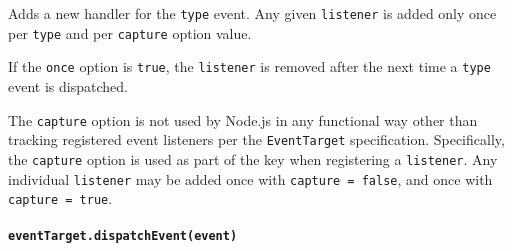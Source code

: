Adds a new handler for the \texttt{type} event. Any given
\texttt{listener} is added only once per \texttt{type} and per
\texttt{capture} option value.

If the \texttt{once} option is \texttt{true}, the \texttt{listener} is
removed after the next time a \texttt{type} event is dispatched.

The \texttt{capture} option is not used by Node.js in any functional way
other than tracking registered event listeners per the
\texttt{EventTarget} specification. Specifically, the \texttt{capture}
option is used as part of the key when registering a \texttt{listener}.
Any individual \texttt{listener} may be added once with
\texttt{capture\ =\ false}, and once with \texttt{capture\ =\ true}.

\begin{Shaded}
\begin{Highlighting}[]
 \NormalTok{(}\NormalTok{) \{\}}

\OperatorTok{=}  \NormalTok{()}\OperatorTok{;}
\NormalTok{(}\OperatorTok{,}\OperatorTok{,}\NormalTok{ \{ }\OperatorTok{:} \NormalTok{ \})}\OperatorTok{;}  
\NormalTok{(}\OperatorTok{,}\OperatorTok{,}\NormalTok{ \{ }\OperatorTok{:} \NormalTok{ \})}\OperatorTok{;} 

\NormalTok{(}\OperatorTok{,}\OperatorTok{;}

\NormalTok{(}\OperatorTok{,}\OperatorTok{,}\NormalTok{ \{ }\OperatorTok{:} \NormalTok{ \})}\OperatorTok{;}
\end{Highlighting}
\end{Shaded}

\paragraph{\texorpdfstring{\texttt{eventTarget.dispatchEvent(event)}}{eventTarget.dispatchEvent(event)}}\label{eventtarget.dispatcheventevent}

